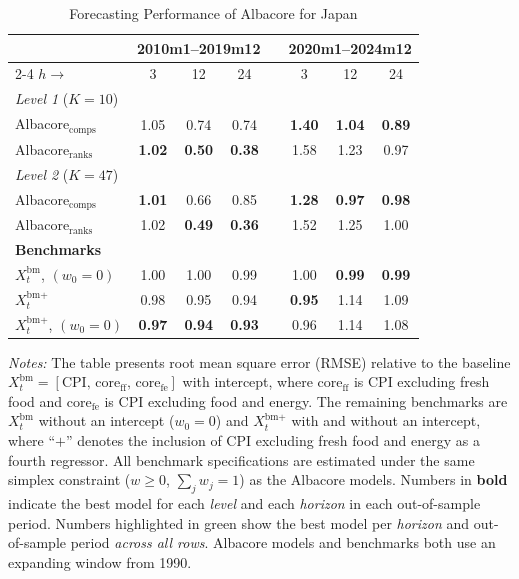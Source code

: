 \begin{table}[ht]
\centering
\caption{Forecasting Performance of Albacore for Japan}
\label{tab:japan}
\begin{threeparttable}
\begin{tabular}{lccccccc}
\toprule
 & \multicolumn{3}{c}{2010m1--2019m12} & \phantom{aa} & \multicolumn{3}{c}{2020m1--2024m12} \\
\cmidrule{2-4} \cmidrule{6-8}
$h \rightarrow$ & 3 & 12 & 24 & & 3 & 12 & 24 \\
\midrule
\multicolumn{8}{l}{\textit{Level 1} ($K = 10$)} \\
\quad Albacore$_{\text{comps}}$ & 1.05 & 0.74 & 0.74 & & \textbf{1.40} & \textbf{1.04} & \textcolor{green!55!black}{\textbf{0.89}} \\
\quad Albacore$_{\text{ranks}}$ & \textbf{1.02} & \textbf{0.50} & \textbf{0.38} & & 1.58 & 1.23 & 0.97 \\
\midrule
\multicolumn{8}{l}{\textit{Level 2} ($K = 47$)} \\
\quad Albacore$_{\text{comps}}$ & \textbf{1.01} & 0.66 & 0.85 & & \textbf{1.28} & \textcolor{green!55!black}{\textbf{0.97}} & \textbf{0.98} \\
\quad Albacore$_{\text{ranks}}$ & 1.02 & \textcolor{green!55!black}{\textbf{0.49}} & \textcolor{green!55!black}{\textbf{0.36}} & & 1.52 & 1.25 & 1.00 \\
\midrule
\multicolumn{8}{l}{\textbf{Benchmarks}} \\
$X^{\text{bm}}_t$, $(w_0 = 0)$ & 1.00 & 1.00 & 0.99 & & 1.00 & \textbf{0.99} & \textbf{0.99} \\
$X^{\text{bm}+}_t$ & 0.98 & 0.95 & 0.94 & & \textcolor{green!55!black}{\textbf{0.95}} & 1.14 & 1.09 \\
$X^{\text{bm}+}_t$, $(w_0 = 0)$ & \textbf{0.97} & \textbf{0.94} & \textbf{0.93} & & 0.96 & 1.14 & 1.08 \\
\bottomrule
\end{tabular}
\begin{tablenotes}[flushleft]
\footnotesize
\item \textit{Notes:} The table presents root mean square error (RMSE) relative to the baseline $X^{\text{bm}}_t = [\text{CPI},\,\text{core}_{\text{ff}},\,\text{core}_{\text{fe}}]$ with intercept, where $\text{core}_{\text{ff}}$ is CPI excluding fresh food and $\text{core}_{\text{fe}}$ is CPI excluding food and energy. The remaining benchmarks are $X^{\text{bm}}_t$ without an intercept ($w_0 = 0$) and $X^{\text{bm}+}_t$ with and without an intercept, where ``$+$'' denotes the inclusion of CPI excluding fresh food and energy as a fourth regressor. All benchmark specifications are estimated under the same simplex constraint ($w \ge 0$, $\sum_j w_j = 1$) as the Albacore models. Numbers in \textbf{bold} indicate the best model for each \textit{level} and each \textit{horizon} in each out-of-sample period. Numbers highlighted in \textcolor{green!55!black}{green} show the best model per \textit{horizon} and out-of-sample period \textit{across all rows}. Albacore models and benchmarks both use an expanding window from 1990.
\end{tablenotes}
\end{threeparttable}
\end{table}
